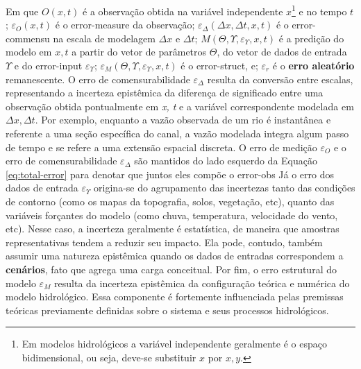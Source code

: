 \documentclass[./main.tex]{subfiles}
\begin{document}
Em que $O(x, t)$ é a observação obtida na variável independente $x$\footnote{Em modelos hidrológicos a variável independente geralmente é o espaço bidimensional, ou seja, deve-se substituir $x$ por $x, y$.} e no tempo $t$; $\varepsilon_{O}(x, t)$ é o \gls{error-measure} da observação; $\varepsilon_{\Delta}(\Delta x,\Delta t, x, t)$ é o \gls{error-commensu} na escala de modelagem $\Delta x$ e $\Delta t$; $M(\Theta, \Upsilon, \varepsilon_{\Upsilon}, x, t)$ é a predição do modelo em $x, t$ a partir do vetor de parâmetros $\Theta$, do vetor de dados de entrada $\Upsilon$ e do \gls{error-input} $\varepsilon_{\Upsilon}$; $\varepsilon_{M}(\Theta, \Upsilon, \varepsilon_{\Upsilon}, x, t)$ é o \gls{error-struct}, e; $\varepsilon_r$ é o \textbf{erro aleatório} remanescente. O erro de comensurabilidade $\varepsilon_{\Delta}$ resulta da conversão entre escalas, representando a incerteza epistêmica da diferença de significado entre uma observação obtida pontualmente em \textit{x, t} e a variável correspondente modelada em $\Delta x, \Delta t$. Por exemplo, enquanto a vazão observada de um rio é instantânea e referente a uma seção específica do canal, a vazão modelada integra algum passo de tempo e se refere a uma extensão espacial discreta. O erro de medição $\varepsilon_{O}$ e o erro de comensurabilidade $\varepsilon_{\Delta}$ são mantidos do lado esquerdo da Equação \eqref{eq:total-error} para denotar que juntos eles compõe o \gls{error-obs} Já o erro dos dados de entrada $\varepsilon_\Upsilon$ origina-se do agrupamento das incertezas tanto das condições de contorno (como os mapas da topografia, solos, vegetação, etc), quanto das variáveis forçantes do modelo (como chuva, temperatura, velocidade do vento, etc). Nesse caso, a incerteza geralmente é estatística, de maneira que amostras representativas tendem a reduzir seu impacto. Ela pode, contudo, também assumir uma natureza epistêmica quando os dados de entradas correspondem a \textbf{cenários}, fato que agrega uma carga conceitual. Por fim, o erro estrutural do modelo $\varepsilon_M$ resulta da incerteza epistêmica da configuração teórica e numérica do modelo hidrológico. Essa componente é fortemente influenciada pelas premissas teóricas previamente definidas sobre o sistema e seus processos hidrológicos.
\end{document}
